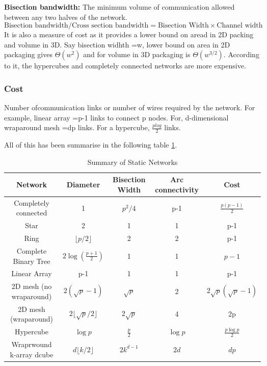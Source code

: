 \documentclass[12pt]{article}
\begin{document}
\textbf{Bisection bandwidth: }The minimum volume of communication allowed between any two halves of the network.
\begin{equation}
    \text{Bisection bandwidth/Cross section bandwidth} = \text{Bisection Width} \times \text{Channel width}
\end{equation}
It is also a measure of cost as it provides a lower bound on aread in 2D packing and volume in 3D.
Say bisection widhth =w, lower bound on area in 2D packaging gives $\Theta(w^2)$ and for volume in 3D packaging is $\Theta(w^{3/2})$.
According to it, the hypercubes and completely connected networks are more expensive.

\subsubsection{Cost}
Number ofcommunication links or number of wires required by the network.
For example, linear array =p-1 links to connect p nodes. For, d-dimensional wraparound mesh =dp links.
For a hypercube, $\frac{plog}{2}$ links. 

All of this has been summarise in the following table \ref{tab:static_network}. 
\begin{table}[H]
    \centering
    \begin{tabular}{|c|c|c|c|c|}
        \hline
        Network & Diameter & Bisection Width & Arc connectivity & Cost  \\
        \hline
        Completely connected & 1 & $p^2/4$ & p-1 & $\frac{p(p-1)}{2}$ \\
        Star & 2 & 1 & 1 & p-1 \\
        Ring & $\lfloor p/2 \rfloor$ & 2 & 2 & p-1 \\
        Complete Binary Tree & $2\log(\frac{p+1}{2})$ & 1 & 1 & $p-1$ \\
        Linear Array & p-1 & 1 & 1 & p-1 \\
        2D mesh (no wraparound) & $2(\sqrt{p}-1)$ & $\sqrt{p}$ & 2 & $2\sqrt{p}(\sqrt{p}-1)$ \\
        2D mesh (wraparound) & $2\lfloor\sqrt{p}/2\rfloor$ & $2\sqrt{p}$ & 4 & 2p \\
        Hypercube & $\log p$ & $\frac{p}{2}$ & $\log p$ & $\frac{p \log p}{2}$ \\
        Wraprwound k-array dcube & $d \lfloor k/2\rfloor$ & $2k^{d-1}$ & $2d$ & $dp$ \\ 
        \hline
    \end{tabular}
    \caption{Summary of Static Networks}
    \label{tab:static_network}
\end{table}
\end{document}

